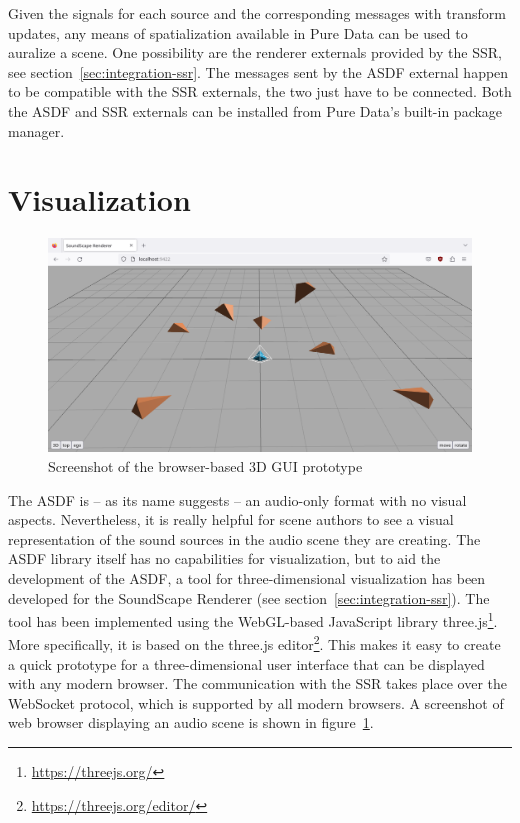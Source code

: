Given the signals for each source and the corresponding messages
with transform updates,
any means of spatialization available in Pure Data
can be used to auralize a scene.
One possibility are the renderer externals provided by the SSR,
see section~\ref{sec:integration-ssr}.
The messages sent by the ASDF external
happen to be compatible with the SSR externals,
the two just have to be connected.
Both the ASDF and SSR externals can be installed
from Pure Data's built-in package manager.


\section{Visualization}
\label{sec:visualization}

\begin{figure}
\includegraphics[width=\textwidth]{images/browser-gui-screenshot}
\caption{Screenshot of the browser-based 3D GUI prototype}
\label{fig:browser-gui-screenshot}
\end{figure}

The ASDF is -- as its name suggests --
an audio-only format with no visual aspects.
Nevertheless, it is really helpful for scene authors
to see a visual representation of the sound sources
in the audio scene they are creating.
The ASDF library itself has no capabilities for visualization,
but to aid the development of the ASDF,
a tool for three-dimensional visualization
has been developed for the SoundScape Renderer
(see section~\ref{sec:integration-ssr}).
The tool has been implemented using the
WebGL-based JavaScript library three.js\footnote{\url{https://threejs.org/}}.
More specifically,
it is based on the three.js
editor\footnote{\url{https://threejs.org/editor/}}.
This makes it easy to create a quick prototype
for a three-dimensional user interface
that can be displayed with any modern browser.
The communication with the SSR takes place over the WebSocket protocol,
which is supported by all modern browsers.
A screenshot of web browser displaying an audio scene
is shown in figure~\ref{fig:browser-gui-screenshot}.

